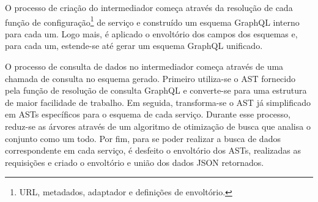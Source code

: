 O processo de criação do intermediador começa através da resolução de cada função de configuração\footnote{
  URL, metadados, adaptador e definições de envoltório.
} de serviço e construído um esquema GraphQL interno para cada um. Logo mais, é aplicado o envoltório dos campos dos esquemas e, para cada um, estende-se até gerar um esquema GraphQL unificado.

O processo de consulta de dados no intermediador começa através de uma chamada de consulta no esquema gerado. Primeiro utiliza-se o AST fornecido pela função de resolução de consulta GraphQL e converte-se para uma estrutura de maior facilidade de trabalho. Em seguida, transforma-se o AST já simplificado em ASTs específicos para o esquema de cada serviço. Durante esse processo, reduz-se as árvores através de um algoritmo de otimização de busca que analisa o conjunto como um todo. Por fim, para se poder realizar a busca de dados correspondente em cada serviço, é desfeito o envoltório dos ASTs, realizadas as requisições e criado o envoltório e união dos dados JSON retornados. \\
